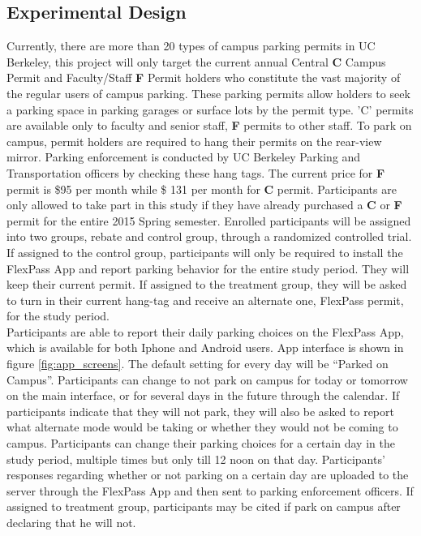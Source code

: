 \documentclass[preprint,12pt]{elsarticle}
\begin{document}
\subsection{Experimental Design}
Currently, there are more than 20 types of campus parking permits in UC Berkeley, this project will only target the current annual Central \textbf{C} Campus Permit and Faculty/Staff \textbf{F} Permit holders who constitute the vast majority of the regular users of campus parking. These parking permits allow holders to seek a parking space in parking garages or surface lots by the permit type. 'C' permits are available only to faculty and senior staff, \textbf{F} permits to other staff. To park on campus, permit holders are required to hang their permits on the rear-view mirror. Parking enforcement is conducted by UC Berkeley Parking and Transportation officers by checking these hang tags. The current price for \textbf{F} permit is \$95 per month while \$ 131 per month for \textbf{C} permit. Participants are only allowed to take part in this study if they have already purchased a \textbf{C} or \textbf{F} permit for the entire 2015 Spring semester. Enrolled participants will be assigned into two groups, rebate and control group, through a randomized controlled trial. If assigned to the control group, participants will only be required to install the FlexPass App and report parking behavior for the entire study period. They will keep their current permit. If assigned to the treatment group, they will be asked to turn in their current hang-tag and receive an alternate one, FlexPass permit, for the study period.  \\

Participants are able to report their daily parking choices on the FlexPass App, which is available for both Iphone and Android users. App interface is shown in figure \ref{fig:app_screens}. The default setting for every day will be “Parked on Campus”. Participants can change to not park on campus for today or tomorrow on the main interface, or for several days in the future through the calendar. If participants indicate that they will not park, they will also be asked to report what alternate mode would be taking or whether they would not be coming to campus. Participants can change their parking choices for a certain day in the study period, multiple times but only till 12 noon on that day. Participants' responses regarding whether or not parking on a certain day are uploaded to the server through the FlexPass App and then sent to parking enforcement officers. If assigned to treatment group, participants may be cited if park on campus after declaring that he will not. 
\end{document}
